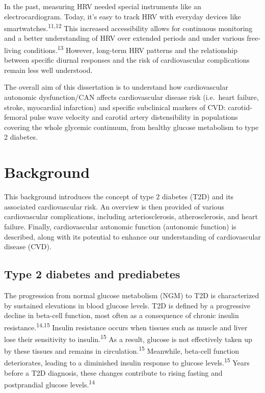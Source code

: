 \documentclass[
  letterpaper,
  headsepline=true,
  open=any]{scrbook}
\begin{document}
In the past, measuring HRV needed special instruments like an
electrocardiogram. Today, it's easy to track HRV with everyday devices
like smartwatches.\textsuperscript{11,12} This increased accessibility
allows for continuous monitoring and a better understanding of HRV over
extended periods and under various free-living
conditions.\textsuperscript{13} However, long-term HRV patterns and the
relationship between specific diurnal responses and the risk of
cardiovascular complications remain less well understood.

The overall aim of this dissertation is to understand how cardiovascular
autonomic dysfunction/CAN affects cardiovascular disease risk
(i.e.~heart failure, stroke, myocardial infarction) and specific
subclinical markers of CVD: carotid-femoral pulse wave velocity and
carotid artery distensibility in populations covering the whole glycemic
continuum, from healthy glucose metabolism to type 2 diabetes.


\hypertarget{background}{%
\chapter{Background}\label{background}}

\newpage

This background introduces the concept of type 2 diabetes (T2D) and its
associated cardiovascular risk. An overview is then provided of various
cardiovascular complications, including arteriosclerosis,
atherosclerosis, and heart failure. Finally, cardiovascular autonomic
function (autonomic function) is described, along with its potential to
enhance our understanding of cardiovascular disease (CVD).

\hypertarget{type-2-diabetes-and-prediabetes}{%
\section{Type 2 diabetes and
prediabetes}\label{type-2-diabetes-and-prediabetes}}

The progression from normal glucose metabolism (NGM) to T2D is
characterized by sustained elevations in blood glucose levels. T2D is
defined by a progressive decline in beta-cell function, most often as a
consequence of chronic insulin resistance.\textsuperscript{14,15}
Insulin resistance occurs when tissues such as muscle and liver lose
their sensitivity to insulin.\textsuperscript{15} As a result, glucose
is not effectively taken up by these tissues and remains in
circulation.\textsuperscript{15} Meanwhile, beta-cell function
deteriorates, leading to a diminished insulin response to glucose
levels.\textsuperscript{15} Years before a T2D diagnosis, these changes
contribute to rising fasting and postprandial glucose
levels.\textsuperscript{14}
\end{document}
